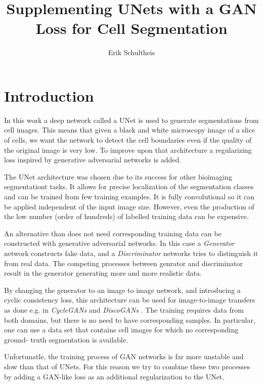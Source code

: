 \documentclass[aps,prl,twocolumn,groupedaddress,amsmath,amssymb]{revtex4-1}
\begin{document}
    \title{Supplementing UNets with a GAN Loss for Cell Segmentation}
    \author{Erik Schultheis}
    \maketitle

	\section{Introduction}

    In this work a deep network called a UNet \cite{ronneberger2015u} is used to generate
    segmentations from cell images. This means that given a black and white microscopy image of a
    slice of cells, we want the  network to detect the cell boundaries even if the quality of the
    original image is very low. To improve upon that architecture a regularizing loss inspired by
    generative adversarial  networks is added.

    The UNet architecture was chosen due to its success for other bioimaging segmentationt tasks. 
    It allows for precise localization of the segmentation classes and can be trained from few
    training examples. It is fully convolutional so it can be applied independent of the input
    image size. However, even the production of the low number (order of hundreds) of labelled
    training data can be expensive. 

    An alternative than does not need corresponding training data can be constructed with 
    generative adversarial networks. In this case a \emph{Generator} network constructs fake data,
    and a \emph{Discriminator} networks tries to distinguish it from real data. The competing 
    processes between genrator and discriminator result in the generator generating more and more
    realistic data. 

    By changing the generator to an image to image network, and introducing a cyclic consistency
    loss, this architecture can be used for image-to-image transfers as done e.g. in
    \emph{CycleGANs} \cite{zhu2017unpaired} and \emph{DiscoGANs} \cite{kim2017learning}.  The
    training requires data from both domains, but there is no need to have corresponding samples. In
    particular, one can use a data  set that contains cell images for which no corresponding ground-
    truth segmentation is available.
    
    Unfortunatle, the training process of GAN networks is far more unstable and slow than that of 
    UNets. For this reason we try to combine these two processes by adding a GAN-like loss as an
    additional regularization to the UNet. 
\end{document}
